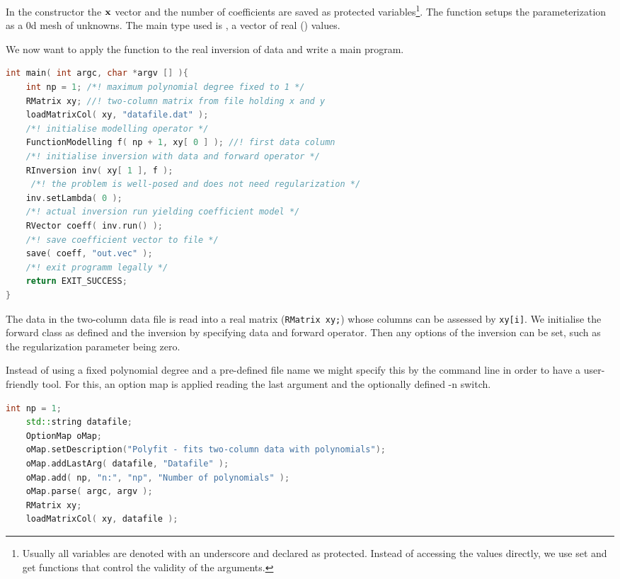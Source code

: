 In the constructor the $\mathbf{x}$ vector and the number of coefficients are saved as protected variables\footnote{Usually all variables are denoted with an underscore and declared as protected. Instead of accessing the values directly, we use set and get functions that control the validity of the arguments.}.
The function  setups the parameterization as a 0d mesh of  unknowns.
The main type used is , a vector of real () values.

We now want to apply the function to the real inversion of data and write a main program.
\begin{lstlisting}[language=C++,morekeywords={RVector,RMatrix,RInversion,EXIT_SUCCESS}]
int main( int argc, char *argv [] ){
    int np = 1; /*! maximum polynomial degree fixed to 1 */
    RMatrix xy; //! two-column matrix from file holding x and y
    loadMatrixCol( xy, "datafile.dat" );
    /*! initialise modelling operator */
    FunctionModelling f( np + 1, xy[ 0 ] ); //! first data column
    /*! initialise inversion with data and forward operator */
    RInversion inv( xy[ 1 ], f );
     /*! the problem is well-posed and does not need regularization */
    inv.setLambda( 0 );
    /*! actual inversion run yielding coefficient model */
    RVector coeff( inv.run() );
    /*! save coefficient vector to file */
    save( coeff, "out.vec" );
    /*! exit programm legally */
    return EXIT_SUCCESS;
}
\end{lstlisting}

The data in the two-column data file is read into a real matrix (\lstinline|RMatrix xy;|) whose columns can be assessed by \lstinline|xy[i]|. We initialise the forward class as defined and the inversion by specifying data and forward operator.
Then any options of the inversion can be set, such as the regularization parameter being zero.

Instead of using a fixed polynomial degree and a pre-defined file name we might specify this by the command line in order to have a user-friendly tool.
For this, an option map is applied reading the last argument and the optionally defined -n switch.
\begin{lstlisting}[language=C++,morekeywords={OptionMap,RMatrix,loadMatrixCol}]
    int np = 1;
    std::string datafile;
    OptionMap oMap;
    oMap.setDescription("Polyfit - fits two-column data with polynomials");
    oMap.addLastArg( datafile, "Datafile" );
    oMap.add( np, "n:", "np", "Number of polynomials" );
    oMap.parse( argc, argv );
    RMatrix xy; 
    loadMatrixCol( xy, datafile );
\end{lstlisting}

